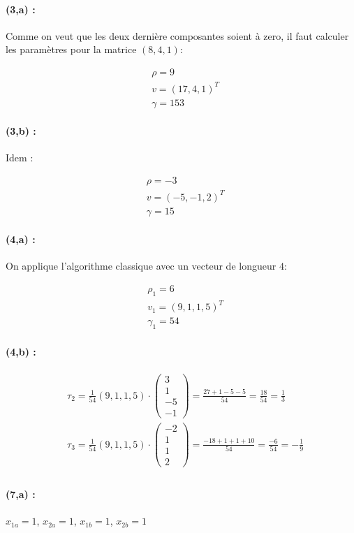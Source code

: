 \documentclass[11pt,a4paper]{report}
\newcommand{\matdddd}[4]{\begin{pmatrix}#1\\#2\\#3\\#4\end{pmatrix}}
\begin{document}
\paragraph*{(3,a) : } Comme on veut que les deux dernière composantes soient à zero, il faut calculer les paramètres pour la matrice $(8,4,1)$:

\begin{align*}
& \rho = 9 \\
& v = (17,4,1)^T \\
& \gamma = 153
\end{align*}

\paragraph*{(3,b) : } Idem :

\begin{align*}
& \rho = -3 \\
& v = (-5,-1,2)^T \\
& \gamma = 15
\end{align*}

\paragraph*{(4,a) : } On applique l'algorithme classique avec un vecteur de longueur $4$:

\begin{align*}
& \rho_1 = 6 \\
& v_1 = (9,1,1,5)^T \\
& \gamma_1 = 54
\end{align*}

\paragraph*{(4,b) : } 

\begin{align*}
& \tau_2 = \frac{1}{54} (9,1,1,5) \cdot \matdddd{3}{1}{-5}{-1} = \frac{27+1-5-5}{54} = \frac{18}{54} = \frac{1}{3} \\
& \tau_3 = \frac{1}{54} (9,1,1,5) \cdot \matdddd{-2}{1}{1}{2} = \frac{-18+1+1+10}{54} = \frac{-6}{54} = -\frac{1}{9} \\
\end{align*}

\paragraph*{(7,a) : }
$x_{1a} = 1$, $x_{2a} = 1$, $x_{1b} = 1$, $x_{2b} = 1$
\end{document}
